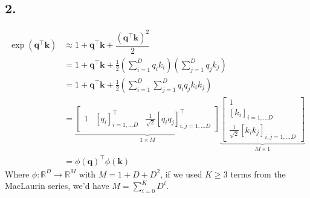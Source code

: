 \documentclass[11pt]{article}
\begin{document}
\subsection{2.}
\begin{align*}
  \exp \left( \bm{q}^{\top} \bm{k} \right) &\approx 1 + \bm{q}^{\top} \bm{k} + \dfrac{\left( \bm{q}^{\top} \bm{k} \right)^{2}}{2} \\
                                           &= 1 + \bm{q}^{\top} \bm{k} + \frac{1}{2} \left( \sum_{i = 1}^{D} q_{i} k_{i} \right) \left( \sum_{j = 1}^{D} q_{j} k_{j} \right)\\
                                           &= 1 + \bm{q}^{\top} \bm{k} + \frac{1}{2} \left( \sum_{i = 1}^{D} \sum_{j = 1}^{D} q_{i} q_{j} k_{i} k_{j} \right) \\
                                           &= \underbrace{\begin{bmatrix}
                                                            1 & \left[ q_{i} \right]_{i = 1, \dots D}^{\top} &\frac{1}{\sqrt{2}} [q_{i}q_{j}]_{i, j = 1, \dots D}^{\top}
                                                          \end{bmatrix}}_{1 \times M}
                                             \underbrace{\begin{bmatrix}
                                                           1 \\
                                                           \left[ k_{i} \right]_{i = 1, \dots D} \\
                                                           \frac{1}{\sqrt{2}} [k_{i}k_{j}]_{i, j = 1, \dots D}
                                                         \end{bmatrix}}_{M \times 1} \\
  &= \phi \left( \bm{q} \right)^{\top} \phi \left( \bm{k} \right)
\end{align*}
Where $\phi : \mathbb{R}^{D} \to \mathbb{R}^{M}$ with $M = 1 + D + D^{2}$, if we used $K \geq 3$ terms from the MacLaurin series, we'd have $M = \sum_{i = 0}^{K} D^{i}$.
\pagebreak
\end{document}
